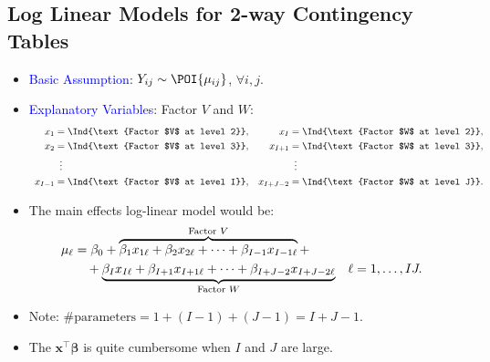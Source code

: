 \documentclass{article}\usepackage[]{graphicx}\usepackage[svgnames]{xcolor}
\let\log\relax%
\providecommand{\Vector}[1]{\bm{#1}}%
\begin{document}
\subsection*{Log Linear Models for 2-way Contingency Tables}
\begin{itemize}
    \item \textcolor{Blue}{Basic Assumption}: $ Y_{ij} \sim \POI{\mu_{ij}} $, $ \forall i,j $.
    \item \textcolor{Blue}{Explanatory Variables}: Factor $V$ and $W$:
          \[ \begin{array}{cc}
                  \begin{aligned}
                      x_1     & =\Ind{\text{Factor $V$ at level 2}}, \\
                      x_2     & =\Ind{\text{Factor $V$ at level 3}}, \\
                              & \vdotswithin{=}                      \\
                      x_{I-1} & =\Ind{\text{Factor $V$ at level I}}, \\
                  \end{aligned} &
                  \begin{aligned}
                      x_I       & =\Ind{\text{Factor $W$ at level 2}}, \\
                      x_{I+1}   & =\Ind{\text{Factor $W$ at level 3}}, \\
                                & \vdotswithin{=}                      \\
                      x_{I+J-2} & =\Ind{\text{Factor $W$ at level J}}. \\
                  \end{aligned}
              \end{array} \]
    \item The main effects log-linear model would be:
          \begin{align*}
              \log{\mu_\ell}
               & =\beta_0+\overbrace{\beta_1x_{1\ell}+\beta_2x_{2\ell}+\cdots+\beta_{I-1}x_{I-1\ell}}^{\text{Factor $V$}}+                               \\
               & \quad+\underbrace{\beta_Ix_{I\ell}+\beta_{I+1}x_{I+1\ell}+\cdots+\beta_{I+J-2}x_{I+J-2\ell}}_{\text{Factor $W$}} &  & \ell=1,\ldots,IJ.
          \end{align*}
    \item Note: $ \text{\# parameters}=1+(I-1)+(J-1)=I+J-1 $.
    \item The $ \Vector{x}^\top \Vector{\beta} $ is quite cumbersome when $ I $ and $ J $ are large.

\end{itemize}
\end{document}
